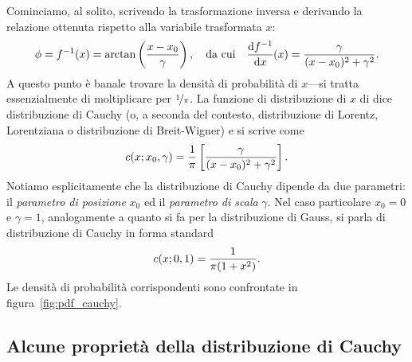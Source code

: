Cominciamo, al solito, scrivendo la trasformazione inversa e derivando la
relazione ottenuta rispetto alla variabile trasformata $x$:
\begin{align*}
  \phi = f^{-1}(x) = \arctan\left(\frac{x - x_0}{\gamma}\right),
  \quad \text{da cui} \quad
  \td{f^{-1}}{x}{x} = \frac{\gamma}{(x - x_0)^2 + \gamma^2}.
\end{align*}
A questo punto è banale trovare la densità di probabilità di $x$---si
tratta essenzialmente di moltiplicare per $\nicefrac{1}{\pi}$. La funzione di
distribuzione di $x$ di dice distribuzione di Cauchy (o, a seconda del contesto,
distribuzione di Lorentz, Lorentziana o distribuzione di Breit-Wigner) e si
scrive come
\begin{align}\label{eq:pdf_cauchy}
  \cauchypdf[x_0, \gamma]{x} =
  \frac{1}{\pi} \left[\frac{\gamma}{(x - x_0)^2 + \gamma^2} \right].
\end{align}
Notiamo esplicitamente che la distribuzione di Cauchy dipende da due parametri:
il \emph{parametro di posizione} $x_0$ ed il \emph{parametro di scala} $\gamma$.
Nel caso particolare $x_0 = 0$ e $\gamma = 1$, analogamente a quanto si fa per
la distribuzione di Gauss, si parla di distribuzione di Cauchy in forma
standard
\begin{align}\label{eq:pdf_cauchy_std}
  \cauchypdf[0, 1]{x} = \frac{1}{\pi(1 + x^2)}.
\end{align}
Le densità di probabilità corrispondenti sono confrontate in
figura~\ref{fig:pdf_cauchy}.



\subsection{Alcune proprietà della distribuzione di Cauchy}

